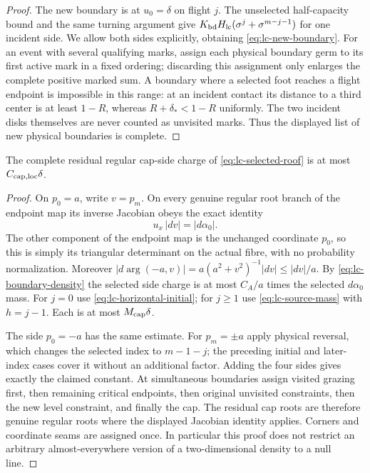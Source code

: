 \begin{proof}
The new boundary is at $u_0=\delta$ on flight $j$.  The unselected
half-capacity bound and the same turning argument give
$K_{\rm bd}H_{\rm lc}(\sigma^j+\sigma^{m-j-1})$ for one incident
side.  We allow both sides explicitly, obtaining
\eqref{eq:lc-new-boundary}.  For an event with several qualifying
marks, assign each physical boundary germ to its first active mark
in a fixed ordering; discarding this assignment only enlarges the
complete positive marked sum.  A boundary where a selected foot
reaches a flight endpoint is impossible in this range: at an incident
contact its distance to a third center is at least $1-R$, whereas
$R+\delta_*<1-R$ uniformly.  The two incident disks themselves
are never counted as unvisited marks.  Thus the displayed list of
new physical boundaries is complete.
\end{proof}

\begin{lemma}
\label{lem:lc-selected-cap}
The complete residual regular cap-side charge of
\eqref{eq:lc-selected-roof} is at most $C_{\rm cap,loc}\delta$.
\end{lemma}
\begin{proof}
On $p_0=a$, write $v=p_m$.  On every genuine regular root branch
of the endpoint map its inverse Jacobian obeys the exact identity
\[
                  u_x\,|dv|=|d\alpha_0|.
\]
The other component of the endpoint map is the unchanged coordinate
$p_0$, so this is simply its triangular determinant on the actual
fibre, with no probability normalization.  Moreover
$|d\arg(-a,v)|=a(a^2+v^2)^{-1}|dv|\le |dv|/a$.
By \eqref{eq:lc-boundary-density} the selected side charge is at
most $C_A/a$ times the selected $d\alpha_0$ mass.
For $j=0$ use \eqref{eq:lc-horizontal-initial}; for $j\ge1$ use
\eqref{eq:lc-source-mass} with $h=j-1$.  Each is at most
$M_{\rm cap}\delta$.

The side $p_0=-a$ has the same estimate.  For $p_m=\pm a$ apply
physical reversal, which changes the selected index to $m-1-j$;
the preceding initial and later-index cases cover it without an
additional factor.  Adding the four sides gives exactly the claimed
constant.  At simultaneous boundaries assign visited grazing first,
then remaining critical endpoints, then original unvisited constraints,
then the new level constraint, and finally the cap.  The residual
cap roots are therefore genuine regular roots where the displayed
Jacobian identity applies.  Corners and coordinate seams are assigned
once.  In particular this proof does not restrict an arbitrary
almost-everywhere version of a two-dimensional density to a null line.
\end{proof}

